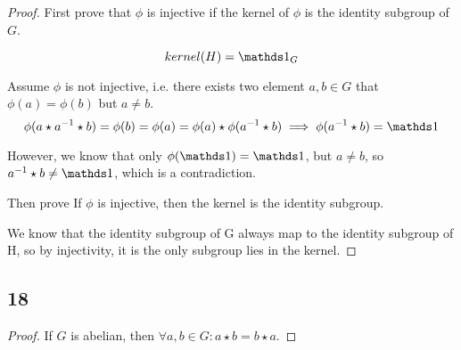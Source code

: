 \begin{proof}
	First prove that $\phi$ is injective if the kernel of $\phi$ is the identity subgroup of $G$.

	$$
		kernel(H) = \one_G
	$$

	Assume $\phi$ is not injective, i.e. there exists two element $a,b \in G$ that $\phi(a) = \phi(b)$ but $a\neq b$.
	$$
		\phi(a \star a^{-1} \star b) = \phi(b) = \phi(a) = \phi(a) \star \phi(a^{-1} \star b) \implies \phi(a^{-1} \star b) = \one
	$$

	However, we know that only $\phi(\one) = \one$, but $a\neq b$, so $a^{-1} \star b \neq \one$, which is a contradiction.

	Then prove If $\phi$ is injective, then the kernel is the identity subgroup.

	We know that the identity subgroup of G always map to the identity subgroup of H,
	so by injectivity, it is the only subgroup lies in the kernel.


\end{proof}

\subsection*{18}

\begin{proof}
	If $G$ is abelian, then $\forall a,b \in G: a \star b = b \star a$.

	
\end{proof}








